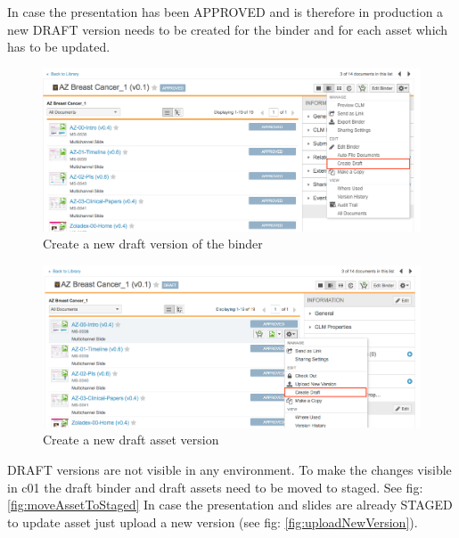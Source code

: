 In case the presentation has been APPROVED and is therefore in production a new DRAFT version needs to be created for the binder and for each asset which has to be updated. 

\begin{center}
\begin{figure}[!h]
\centering\includegraphics[width=\textwidth]{images/createDraftBinder.png} 
\caption{Create a new draft version of the binder} \label{fig:draftBinder}
\end{figure}
\end{center}

\begin{center}
\begin{figure}[!htb]
\centering\includegraphics[width=\textwidth]{images/createDraftAsset.png} 
\caption{Create a new draft asset version} \label{fig:draftAsset}
\end{figure}
\end{center}

DRAFT versions are not visible in any environment. To make the changes visible in c01 the draft binder and draft assets need to be moved to staged. See fig:\ref{fig:moveAssetToStaged} In case the presentation and slides are already STAGED to update asset just upload a new version (see fig: \ref{fig:uploadNewVersion}).

